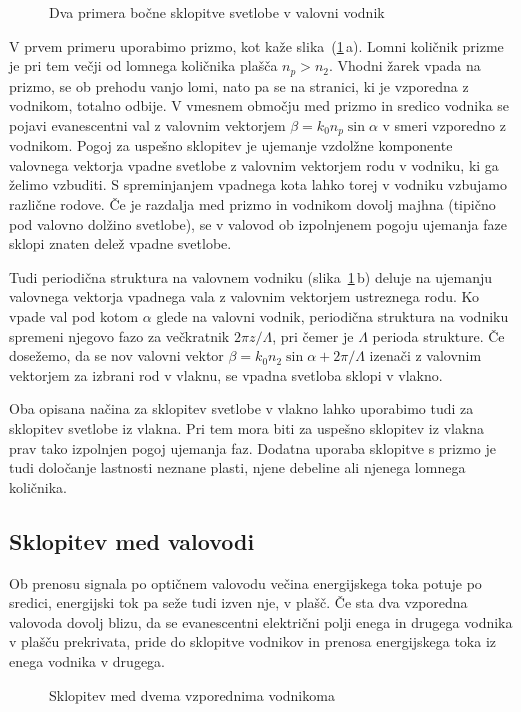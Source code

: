 \begin{figure}[h]
\centering
\def\svgwidth{120truemm} 
 
\caption{Dva primera bočne sklopitve svetlobe v valovni vodnik}
\label{fig:coupler}
\end{figure}
V prvem primeru uporabimo prizmo, kot kaže slika~(\ref{fig:coupler}\,a). Lomni količnik prizme
je pri tem večji od lomnega količnika plašča $n_p > n_2$.
Vhodni žarek vpada na prizmo, se ob prehodu vanjo lomi, nato pa se na stranici, ki je vzporedna
z vodnikom, totalno odbije. V vmesnem območju med prizmo in sredico vodnika se pojavi evanescentni
val z valovnim vektorjem $\beta  = k_0 n_p \sin \alpha$ v smeri vzporedno z vodnikom. Pogoj za uspešno 
sklopitev je ujemanje vzdolžne komponente valovnega vektorja vpadne svetlobe z valovnim 
vektorjem rodu v vodniku, ki ga želimo vzbuditi. 
S spreminjanjem vpadnega kota lahko torej v vodniku vzbujamo različne rodove. 
Če je razdalja med prizmo in vodnikom dovolj majhna (tipično pod valovno dolžino svetlobe), se v 
valovod ob izpolnjenem pogoju ujemanja faze sklopi znaten delež vpadne svetlobe.

Tudi periodična struktura na valovnem vodniku (slika~\ref{fig:coupler}\,b) deluje na 
ujemanju valovnega vektorja vpadnega vala z valovnim vektorjem ustreznega rodu.
Ko vpade val pod kotom $\alpha$ glede na valovni vodnik, periodična struktura na vodniku 
spremeni njegovo fazo za večkratnik $2 \pi z/\Lambda$, pri čemer je $\Lambda$ perioda strukture.
Če dosežemo, da se nov valovni vektor $\beta = k_0 n_2 \sin \alpha+ 2 \pi/\Lambda$ izenači z valovnim 
vektorjem za izbrani rod v vlaknu, se vpadna svetloba sklopi v vlakno.

\begin{remark}
 Oba opisana načina za sklopitev svetlobe v vlakno lahko uporabimo tudi za sklopitev svetlobe 
 iz vlakna. Pri tem mora biti za uspešno sklopitev iz vlakna prav tako izpolnjen pogoj ujemanja faz.
 Dodatna uporaba sklopitve s prizmo je tudi določanje lastnosti neznane plasti, njene debeline
 ali njenega lomnega količnika.
\end{remark}

\subsection*{Sklopitev med valovodi}
Ob prenosu signala po optičnem valovodu večina energijskega toka potuje po sredici,
energijski tok pa seže tudi izven nje, v plašč. Če sta dva vzporedna valovoda dovolj blizu, da
se evanescentni električni polji enega in drugega vodnika v plašču prekrivata, pride do 
sklopitve vodnikov in prenosa energijskega toka iz enega vodnika v drugega. 
\begin{figure}[h]
\centering
\def\svgwidth{80truemm} 
 
\caption{Sklopitev med dvema vzporednima vodnikoma}
\label{fig:fcoupler}
\end{figure}

